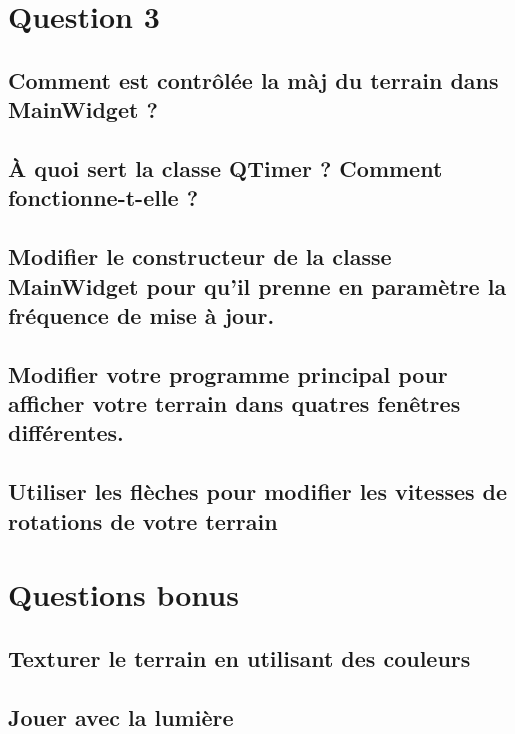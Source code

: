\documentclass[a4paper,11pt]{report}
\begin{document}
	\pagebreak	
	\section{Question 3}
	\subsection{Comment est contrôlée la màj du terrain dans MainWidget ?}
	
	\subsection{À quoi sert la classe QTimer ? Comment fonctionne-t-elle ?}
	
	\subsection{Modifier le constructeur de la classe MainWidget pour qu'il prenne en paramètre la fréquence de mise à jour.}
	
	\subsection{Modifier votre programme principal pour afficher votre terrain dans quatres fenêtres différentes.}
	
	\subsection{Utiliser les flèches pour modifier les vitesses de rotations de votre terrain}
    
    \pagebreak
    \section{Questions bonus}
    \subsection{Texturer le terrain en utilisant des couleurs}
    
    \subsection{Jouer avec la lumière}
\end{document}
